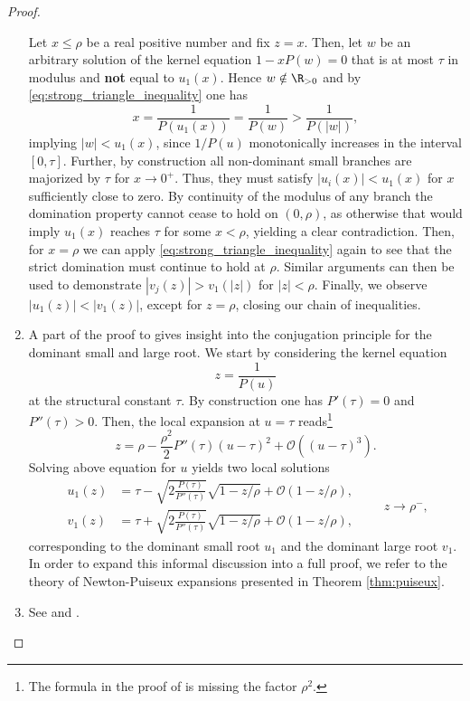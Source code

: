 \begin{proof}
\begin{enumerate}
    Let $x \leq \rho$ be a real positive number and fix $z = x$. Then, let $w$ be an arbitrary solution of the kernel equation $1 - xP(w) = 0$ that is at most $\tau$ in modulus and \textbf{not} equal to $u_1(x)$. Hence $w \notin \R_{> 0}$ and by \eqref{eq:strong_triangle_inequality} one has
    $$
      x = \frac{1}{P(u_1(x))} = \frac{1}{P(w)} > \frac{1}{P(|w|)},
    $$
    implying $|w| < u_1(x)$, since $1/P(u)$ monotonically increases in the interval $[0, \tau]$. Further, by construction all non-dominant small branches are majorized by $\tau$ for $x \to 0^+$. Thus, they must satisfy $|u_i(x)| < u_1(x)$ for $x$ sufficiently close to zero. By continuity of the modulus of any branch the domination property cannot cease to hold on $(0,\rho)$, as otherwise that would imply $u_1(x)$ reaches $\tau$ for some $x < \rho$, yielding a clear contradiction. Then, for $x = \rho$ we can apply \eqref{eq:strong_triangle_inequality} again to see that the strict domination must continue to hold at $\rho$. 
    Similar arguments can then be used to demonstrate $|v_j(z)| > v_1(|z|)$ for $|z| < \rho$.
    Finally, we observe $|u_1(z)| < |v_1(z)|$, except for $z = \rho$, closing our chain of inequalities.
    \item A part of the proof to \cite[Theorem 3]{Basic} gives insight 
    into the conjugation principle for the dominant small and large root.
    We start by considering the kernel equation
    \begin{equation*}
      z = \frac{1}{P(u)}
    \end{equation*}
    at the structural constant $\tau$. By construction one has $P'(\tau) = 0$ and $P''(\tau) > 0$. Then, the local expansion at $u = \tau$ reads\footnote{The formula in the proof of \cite[Theorem 3, p.~62]{Basic} is missing the factor $\rho^2$.}
    $$
      z = \rho - \frac{\rho^2}{2}P''(\tau)(u - \tau)^2 + 
      \mathcal{O}\left(
        (u - \tau)^3
    \right).
    $$
    Solving above equation for $u$ yields two local solutions
    \begin{equation*}
      \begin{split}
        u_1(z) &= \tau - \sqrt{2\frac{P(\tau)}{P''(\tau)}}\sqrt{1 - z/\rho} + \mathcal{O}(1 - z/\rho), \\
        v_1(z) &= \tau + \sqrt{2\frac{P(\tau)}{P''(\tau)}}\sqrt{1 - z/\rho} + \mathcal{O}(1 - z/\rho),
      \end{split} \qquad z \to \rho^{-},
    \end{equation*}
    corresponding to the dominant small root $u_1$ and the dominant large root $v_1$. In order to expand this informal discussion into a full proof, we refer to the theory of Newton-Puiseux expansions presented in Theorem \ref{thm:puiseux}.
    \item See \cite[Theorem 3, p.~61--64]{Basic} and \cite[Theorem 6, pp.~72--75]{Basic}. \qedhere
  \end{enumerate}
\end{proof}


